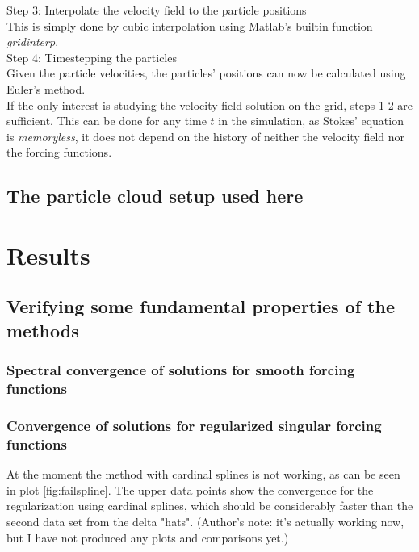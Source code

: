 \documentclass[a4paper,
twoside=false,abstract=false,numbers=noenddot,
titlepage=false,headings=small,parskip=half,version=last]{scrartcl}
\begin{document}
Step 3: Interpolate the velocity field to the particle positions\\
This is simply done by cubic interpolation using Matlab's builtin function \emph{gridinterp}.\\
Step 4: Timestepping the particles\\
Given the particle velocities, the particles' positions can now be calculated using Euler's method.\\

If the only interest is studying the velocity field solution on the grid, steps 1-2 are sufficient. This can be done for any time $t$ in the simulation, as Stokes' equation is \emph{memoryless}, it does not depend on the history of neither the velocity field nor the forcing functions.

\subsection{The particle cloud setup used here}

\section{Results}

\subsection{Verifying some fundamental properties of the methods}

\subsubsection{Spectral convergence of solutions for smooth forcing functions}
\subsubsection{Convergence of solutions for regularized singular forcing functions}

At the moment the method with cardinal splines is not working, as can be seen in plot \ref{fig:failspline}. The upper data points show the convergence for the regularization using cardinal splines, which should be considerably faster than the second data set from the delta "hats". (Author's note: it's actually working now, but I have not produced any plots and comparisons yet.)
\end{document}

